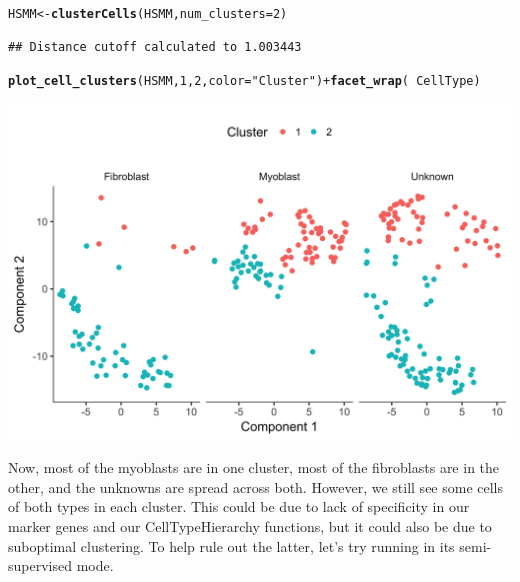 \documentclass[10pt,oneside]{article}\usepackage[]{graphicx}\usepackage[]{color}
\makeatletter
\def\maxwidth{ %
  \ifdim\Gin@nat@width>\linewidth
    \linewidth
  \else
    \Gin@nat@width
  \fi
}
\newcommand{\hlnum}[1]{\textcolor[rgb]{0.686,0.059,0.569}{#1}}%
\newcommand{\hlstr}[1]{\textcolor[rgb]{0.192,0.494,0.8}{#1}}%
\newcommand{\hlopt}[1]{\textcolor[rgb]{0,0,0}{#1}}%
\newcommand{\hlstd}[1]{\textcolor[rgb]{0.345,0.345,0.345}{#1}}%
\newcommand{\hlkwb}[1]{\textcolor[rgb]{0.69,0.353,0.396}{#1}}%
\newcommand{\hlkwc}[1]{\textcolor[rgb]{0.333,0.667,0.333}{#1}}%
\newcommand{\hlkwd}[1]{\textcolor[rgb]{0.737,0.353,0.396}{\textbf{#1}}}%
\newenvironment{kframe}{%
 \def\at@end@of@kframe{}%
 \ifinner\ifhmode%
  \def\at@end@of@kframe{\end{minipage}}%
  \begin{minipage}{\columnwidth}%
 \fi\fi%
 \def\FrameCommand##1{\hskip\@totalleftmargin \hskip-\fboxsep
 \colorbox{shadecolor}{##1}\hskip-\fboxsep
     \hskip-\linewidth \hskip-\@totalleftmargin \hskip\columnwidth}%
 \MakeFramed {\advance\hsize-\width
   \@totalleftmargin\z@ \linewidth\hsize
   \@setminipage}}%
 {\par\unskip\endMakeFramed%
 \at@end@of@kframe}
\newenvironment{knitrout}{}{} %
\makeatother
\begin{document}
\begin{knitrout}
\color{fgcolor}\begin{kframe}
\begin{alltt}
\hlstd{HSMM} \hlkwb{<-} \hlkwd{clusterCells}\hlstd{(HSMM,} \hlkwc{num_clusters}\hlstd{=}\hlnum{2}\hlstd{)}
\end{alltt}
\begin{verbatim}
## Distance cutoff calculated to 1.003443
\end{verbatim}


{\ttfamily\noindent\itshape\color{messagecolor}{\#\# the length of the distance: 34191}}\begin{alltt}
\hlkwd{plot_cell_clusters}\hlstd{(HSMM,} \hlnum{1}\hlstd{,} \hlnum{2}\hlstd{,} \hlkwc{color}\hlstd{=}\hlstr{"Cluster"}\hlstd{)} \hlopt{+} \hlkwd{facet_wrap}\hlstd{(}\hlopt{~}\hlstd{CellType)}
\end{alltt}
\end{kframe}

{\centering \includegraphics[width=\maxwidth]{figure/cluster_cells_unsup_plot_by_cell_type-1} 

}



\end{knitrout}
 
Now, most of the myoblasts are in one cluster, most of the fibroblasts are in the other, and the unknowns are spread across both. However, we still see some cells of both types in each cluster. This could be due to lack of specificity in our marker genes and our CellTypeHierarchy functions, but it could also be due to suboptimal clustering. To help rule out the latter, let's try running  in its semi-supervised mode.  
  
\end{document}
